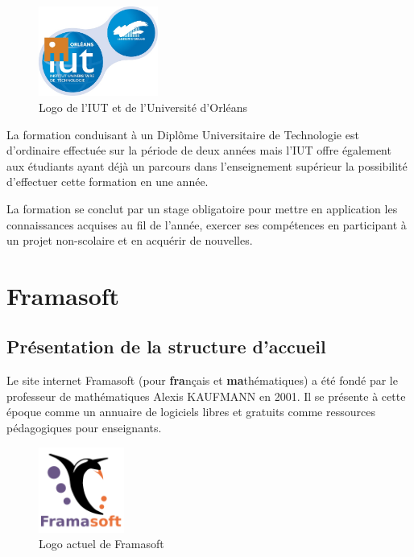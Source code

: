\documentclass[10pt,a4paper, twoside]{report}
\begin{document}
	\begin{figure}[ht]
		\centering
		\includegraphics[width=0.35\textwidth]{images/logo-iut.png}
		\caption*{Logo de l'IUT et de l'Université d'Orléans}
		\label{normal_case}
	\end{figure}
	
	La formation conduisant à un Diplôme Universitaire de Technologie est d'ordinaire effectuée sur la période de deux années mais l'IUT offre également aux étudiants ayant déjà un parcours dans l'enseignement supérieur la possibilité d'effectuer cette formation en une année.
	
	La formation se conclut par un stage obligatoire pour mettre en application les connaissances acquises au fil de l'année, exercer ses compétences en participant à un projet non-scolaire et en acquérir de nouvelles.
	
	\section{Framasoft}
	\subsection{Présentation de la structure d'accueil}
	
	Le site internet Framasoft (pour \textbf{fra}nçais et \textbf{ma}thématiques) a été fondé par le professeur de mathématiques Alexis KAUFMANN en 2001. Il se présente à cette époque comme un annuaire de logiciels libres et gratuits comme ressources pédagogiques pour enseignants.
	
	\begin{figure}[ht]
		\centering
		\includegraphics[width=0.25\textwidth]{images/Framasoft-Logo.png}
		\caption*{Logo actuel de Framasoft}
		\label{normal_case}
	\end{figure}
	
\end{document}
